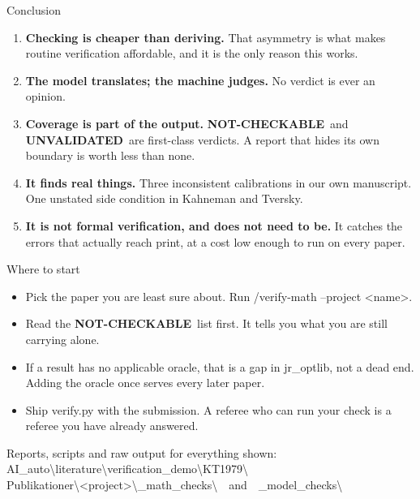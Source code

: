\documentclass[aspectratio=169,11pt]{beamer}
\newcommand{\code}[1]{{\ttfamily\small #1}}
\newcommand{\UNV}{{\color{flagamber}\bfseries UNVALIDATED}}
\newcommand{\NC}{{\color{slate}\bfseries NOT-CHECKABLE}}
\begin{document}
\begin{frame}{Conclusion}
  \begin{enumerate}\itemsep0.7em
    \item \textbf{Checking is cheaper than deriving.} That asymmetry is what makes routine
          verification affordable, and it is the only reason this works.
    \item \textbf{The model translates; the machine judges.} No verdict is ever an opinion.
    \item \textbf{Coverage is part of the output.} \NC\ and \UNV\ are first-class verdicts. A
          report that hides its own boundary is worth less than none.
    \item \textbf{It finds real things.} Three inconsistent calibrations in our own manuscript.
          One unstated side condition in Kahneman and Tversky.
    \item \textbf{It is not formal verification, and does not need to be.} It catches the errors
          that actually reach print, at a cost low enough to run on every paper.
  \end{enumerate}
\end{frame}

\begin{frame}{Where to start}
  \begin{itemize}\itemsep0.8em
    \item Pick the paper you are least sure about. Run \code{/verify-math --project <name>}.
    \item Read the \NC\ list first. It tells you what you are still carrying alone.
    \item If a result has no applicable oracle, that is a gap in \code{jr\_optlib}, not a dead end.
          Adding the oracle once serves every later paper.
    \item Ship \code{verify.py} with the submission. A referee who can run your check is a referee
          you have already answered.
  \end{itemize}
  \vfill
  \begin{center}
  {\color{slate}Reports, scripts and raw output for everything shown:\\
  \code{AI\_auto{\textbackslash}literature{\textbackslash}verification\_demo{\textbackslash}KT1979{\textbackslash}}\\
  \code{Publikationer{\textbackslash}<project>{\textbackslash}\_math\_checks{\textbackslash}}\ \ and\ \ \code{\_model\_checks{\textbackslash}}}
  \end{center}
\end{frame}
\end{document}
